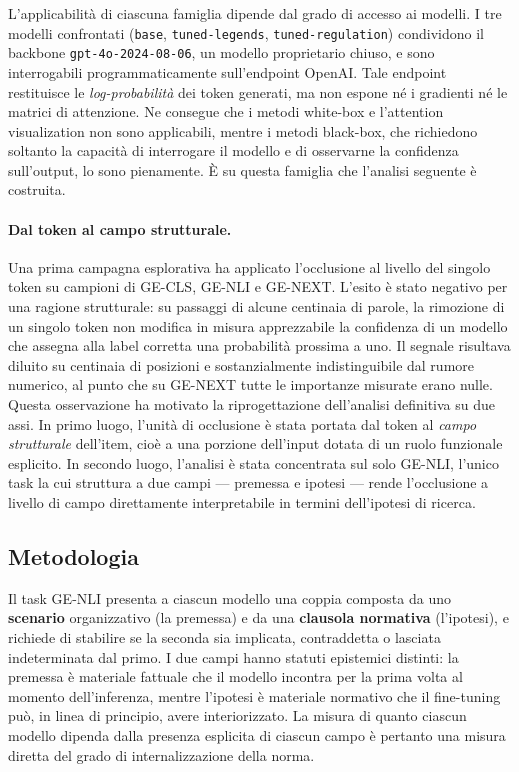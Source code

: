 \documentclass[pdflatex, sn-apa]{sn-jnl}%
\theoremstyle{thmstyleone}%
\theoremstyle{thmstyletwo}%
\theoremstyle{thmstylethree}%
\newcommand{\modelbase}{\texttt{base}}
\newcommand{\modellegends}{\texttt{tuned-legends}}
\newcommand{\modelreg}{\texttt{tuned-regulation}}
\begin{document}
L'applicabilità di ciascuna famiglia dipende dal grado di accesso ai modelli. I
tre modelli confrontati (\modelbase{}, \modellegends{}, \modelreg{}) condividono
il backbone \texttt{gpt-4o-2024-08-06}, un modello proprietario chiuso, e sono
interrogabili programmaticamente sull'endpoint OpenAI. Tale endpoint restituisce
le \emph{log-probabilità} dei token generati, ma non espone né i gradienti né le
matrici di attenzione. Ne consegue che i metodi white-box e l'attention
visualization non sono applicabili, mentre i metodi black-box, che richiedono
soltanto la capacità di interrogare il modello e di osservarne la confidenza
sull'output, lo sono pienamente. È su questa famiglia che l'analisi seguente è
costruita.

\paragraph{Dal token al campo strutturale.}
Una prima campagna esplorativa ha applicato l'occlusione al livello del singolo
token su campioni di GE-CLS, GE-NLI e GE-NEXT. L'esito è stato negativo per una
ragione strutturale: su passaggi di alcune centinaia di parole, la rimozione di
un singolo token non modifica in misura apprezzabile la confidenza di un modello
che assegna alla label corretta una probabilità prossima a uno. Il segnale
risultava diluito su centinaia di posizioni e sostanzialmente indistinguibile dal
rumore numerico, al punto che su GE-NEXT tutte le importanze misurate erano nulle.
Questa osservazione ha motivato la riprogettazione dell'analisi definitiva su due
assi. In primo luogo, l'unità di occlusione è stata portata dal token al
\emph{campo strutturale} dell'item, cioè a una porzione dell'input dotata di un
ruolo funzionale esplicito. In secondo luogo, l'analisi è stata concentrata sul
solo GE-NLI, l'unico task la cui struttura a due campi --- premessa e ipotesi ---
rende l'occlusione a livello di campo direttamente interpretabile in termini
dell'ipotesi di ricerca.

\subsection{Metodologia}
\label{sec:xai:method}

Il task GE-NLI presenta a ciascun modello una coppia composta da uno
\textbf{scenario} organizzativo (la premessa) e da una \textbf{clausola
normativa} (l'ipotesi), e richiede di stabilire se la seconda sia implicata,
contraddetta o lasciata indeterminata dal primo. I due campi hanno statuti
epistemici distinti: la premessa è materiale fattuale che il modello incontra per
la prima volta al momento dell'inferenza, mentre l'ipotesi è materiale normativo
che il fine-tuning può, in linea di principio, avere interiorizzato. La misura di
quanto ciascun modello dipenda dalla presenza esplicita di ciascun campo è
pertanto una misura diretta del grado di internalizzazione della norma.
\end{document}
